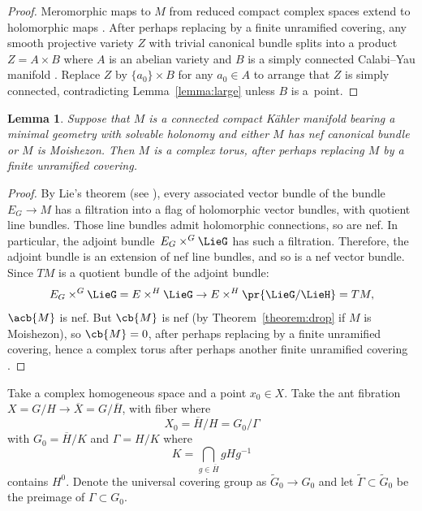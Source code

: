 \documentclass[10pt,a4paper]{amsart}
\numberwithin{equation}{section}
\newtheorem{Lemma}[Theorem]{Lemma}
\newcommand{\GZ}{G_0}
\newcommand{\tGZ}{\widetilde{G}_0}
\begin{document}
\begin{proof}
Meromorphic maps to $M$ from reduced compact complex spaces extend to holomorphic maps \cite[Lemma 26]{Biswas.McKay:2016}.
After perhaps replacing by a finite unramified covering, any smooth projective variety $Z$ with trivial canonical bundle splits into a product $Z=A \times B$ where $A$ is an abelian variety and $B$ is a simply connected Calabi--Yau manifold \cite{Bogomolov:1974}.
Replace $Z$ by $\{a_0\} \times B$ for any $a_0 \in A$ to arrange that $Z$ is simply connected, contradicting
Lemma~\ref{lemma:large} unless $B$ is a~point.
\end{proof}

\begin{Lemma}\label{lemma:solvable.nef}
Suppose that $M$ is a connected compact K\"ahler manifold bearing a minimal geometry with solvable holonomy and either $M$ has nef canonical bundle or $M$ is Moishezon.
Then $M$ is a complex torus, after perhaps replacing $M$ by a finite unramified covering.
\end{Lemma}

\begin{proof}
By Lie's theorem (see \cite[Theorem 3]{Serre:2001}), every associated vector bundle of the bundle $E_G \to M$ has a filtration into a flag of holomorphic vector bundles, with quotient line bundles.
Those line bundles admit holomorphic connections, so are nef.
In particular, the adjoint bundle~$E_G \times^G \LieG$ has such a filtration.
Therefore, the adjoint bundle is an extension of nef line bundles, and so is a nef vector bundle.
Since $TM$ is a quotient bundle of the adjoint bundle:
\[
E_G \times^G \LieG = E \times^H \LieG \to E \times^H \pr{\LieG/\LieH} = TM,
\]
$\acb{M}$ is nef.
But $\cb{M}$ is nef (by Theorem~\ref{theorem:drop} if $M$ is Moishezon), so $\cb{M} = 0$, after perhaps replacing by a finite unramified covering, hence a complex torus after perhaps another finite unramified covering \cite{Biswas.McKay:2010}.
\end{proof}

Take a complex homogeneous space  and a point $x_0 \in X$.
Take the ant fibration $X = G/H \to \overline{X} = G/\overline{H}$, with fiber \pr{X_0,\GZ} where
\[
X_0 = \overline{H}/H = \GZ/\Gamma
\]
with $\GZ = \overline{H}/K$ and $\Gamma = H/K$ where
\[
K = \bigcap_{g\in\overline{H}} gHg^{-1}
\]
contains $H^0$.
Denote the universal covering group as $\tGZ \to \GZ$ and let $\widetilde{\Gamma} \subset \tGZ$ be the
preimage of $\Gamma \subset \GZ$.
\end{document}
